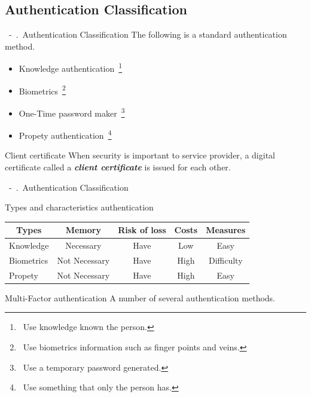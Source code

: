 \documentclass{beamer}
\newcommand{\shownum}{\thesection\ -\ \thesubsection.\ }
\begin{document}
\subsection{Authentication Classification}
\begin{frame}{\shownum Authentication Classification}
    The following is a standard authentication method.
    \begin{block}{}
        \begin{itemize}
            \item Knowledge authentication\ \footnote{\ Use knowledge known the person.}
            \item Biometrics\ \footnote{\ Use biometrics information such as finger points and veins.}
            \item One-Time password maker\ \footnote{\ Use a temporary password generated.}
            \item Propety authentication\ \footnote{\ Use something that only the person has.}
        \end{itemize}
    \end{block}
    \begin{exampleblock}{Client certificate}
        When security is important to service provider, a digital certificate called a \textbf{\it client certificate} is issued for each other.
    \end{exampleblock}
\end{frame}
\begin{frame}{\shownum Authentication Classification}
    \begin{block}{Types and characteristics authentication}
        \begin{table}
            \centering
            \renewcommand{\arraystretch}{1.5}
            \begin{tabular}[c]{lcccc}
                \multicolumn{1}{c}{Types} & Memory        & Risk of loss & Costs & Measures   \\
                \hline
                Knowledge                 & Necessary     & Have         & Low   & Easy       \\
                Biometrics                & Not Necessary & Have         & High  & Difficulty \\
                Propety                   & Not Necessary & Have         & High  & Easy       \\
            \end{tabular}
        \end{table}
    \end{block}
    \begin{exampleblock}{Multi-Factor authentication}
        A number of several authentication methods.
    \end{exampleblock}
\end{frame}
\end{document}
